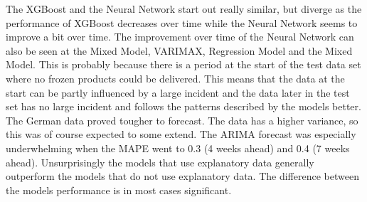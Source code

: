 The XGBoost and the Neural Network start out really similar, but diverge as the performance of XGBoost decreases over time while the Neural Network seems to improve a bit over time. The improvement over time of the Neural Network can also be seen at the Mixed Model, VARIMAX, Regression Model and the Mixed Model. This is probably because there is a period at the start of the test data set where no frozen products could be delivered. This means that the data at the start can be partly influenced by a large incident and the data later in the test set has no large incident and follows the patterns described by the models better.\\

The German data proved tougher to forecast. The data has a higher variance, so this was of course expected to some extend. The ARIMA forecast was especially underwhelming when the MAPE went to 0.3 (4 weeks ahead) and 0.4 (7 weeks ahead). Unsurprisingly the models that use explanatory data generally outperform the models that do not use explanatory data. The difference between the models performance is in most cases significant.\\

